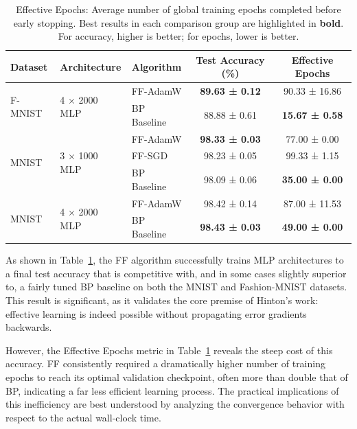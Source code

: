 \begin{table}[htbp]
    \centering
    \caption{Performance Comparison: FF vs. BP on MLP Architectures (Mean ± Std Dev over 3 runs).}
    \label{tab:ff_bp_mlp_perf_results_ch4}
    \begin{tabular}{lll c c}
        \toprule
        Dataset & Architecture & Algorithm & Test Accuracy (\%) & Effective Epochs \\
        \midrule
        \multirow{2}{*}{F-MNIST} & \multirow{2}{*}{4 $\times$ 2000 MLP} & FF-AdamW & \textbf{89.63 ± 0.12} & 90.33 ± 16.86 \\
         & & BP Baseline& 88.88 ± 0.61 & \textbf{15.67 ± 0.58} \\
        \midrule
        \multirow{3}{*}{MNIST} & \multirow{3}{*}{3 $\times$ 1000 MLP} & FF-AdamW & \textbf{98.33 ± 0.03} & 77.00 ± 0.00 \\
         & & FF-SGD & 98.23 ± 0.05 & 99.33 ± 1.15 \\
         & & BP Baseline & 98.09 ± 0.06 & \textbf{35.00 ± 0.00} \\
        \midrule
        \multirow{2}{*}{MNIST} & \multirow{2}{*}{4 $\times$ 2000 MLP} & FF-AdamW & 98.42 ± 0.14 & 87.00 ± 11.53 \\
         & & BP Baseline & \textbf{98.43 ± 0.03} & \textbf{49.00 ± 0.00} \\
        \bottomrule
    \end{tabular}
    \caption*{\footnotesize Effective Epochs: Average number of global training epochs completed before early stopping. Best results in each comparison group are highlighted in \textbf{bold}. For accuracy, higher is better; for epochs, lower is better.}
\end{table}

As shown in Table~\ref{tab:ff_bp_mlp_perf_results_ch4}, the FF algorithm successfully trains MLP architectures to a final test accuracy that is competitive with, and in some cases slightly superior to, a fairly tuned BP baseline on both the MNIST and Fashion-MNIST datasets.  This result is significant, as it validates the core premise of Hinton's work: effective learning is indeed possible without propagating error gradients backwards.

However, the Effective Epochs metric in Table~\ref{tab:ff_bp_mlp_perf_results_ch4} reveals the steep cost of this accuracy. FF consistently required a dramatically higher number of training epochs to reach its optimal validation checkpoint, often more than double that of BP, indicating a far less efficient learning process. The practical implications of this inefficiency are best understood by analyzing the convergence behavior with respect to the actual wall-clock time.

